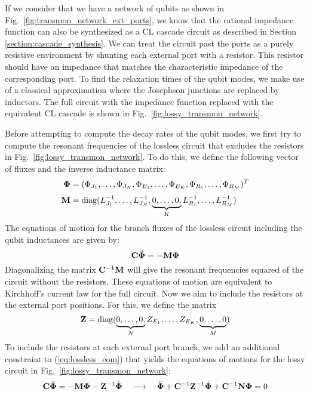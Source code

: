 If we consider that we have a network of qubits as shown in Fig.\ \ref{fig:transmon_network_ext_ports}, we know that the rational impedance function can also be synthesized as a CL cascade circuit as described in Section \ref{section:cascade_synthesis}. We can treat the circuit past the ports as a purely resistive environment by shunting each external port with a resistor. This resistor should have an impedance that matches the characteristic impedance of the corresponding port. To find the relaxation times of the qubit modes, we make use of a classical approximation where the Josephson junctions are replaced by inductors. The full circuit with the impedance function replaced with the equivalent CL cascade is shown in Fig.\ \ref{fig:lossy_transmon_network}. 

Before attempting to compute the decay rates of the qubit modes, we first try to compute the resonant frequencies of the lossless circuit that excludes the resistors in Fig.\ \ref{fig:lossy_transmon_network}. To do this, we define the following vector of fluxes and the inverse inductance matrix:
\begin{align}
    \vb{\Phi} &= (\Phi_{J_1},\dots,\Phi_{J_N},\Phi_{E_1},\dots,\Phi_{E_K},\Phi_{R_1},\dots,\Phi_{R_M})^T \\[.1cm]
    \vb{M} &= \operatorname{diag}(L_{J_1}^{-1},\dots,L_{J_N}^{-1},\underbrace{0,\dots,0,}_{K} L_{R_1}^{-1},\dots,L_{R_M}^{-1})
\end{align}
The equations of motion for the branch fluxes of the lossless circuit including the qubit inductances are given by:
\begin{equation}\label{eq:lossless_eom}
    \vb{C}\ddot{\vb{\Phi}} = -\vb{M}\vb{\Phi}
\end{equation}
Diagonalizing the matrix $\vb{C}^{-1}\vb{M}$ will give the resonant frequencies squared of the circuit without the resistors. These equations of motion are equivalent to Kirchhoff's current law for the full circuit. Now we aim to include the resistors at the external port positions. For this, we define the matrix 
\begin{equation}
    \vb{Z} = \operatorname{diag}(\underbrace{0,\dots,0,}_{N}Z_{E_1},\dots,Z_{E_K},\underbrace{0,\dots,0}_{M})
\end{equation}
To include the resistors at each external port branch, we add an additional constraint to (\ref{eq:lossless_eom}) that yields the equations of motions for the lossy circuit in Fig.\ \ref{fig:lossy_transmon_network}:
\begin{equation}\label{eq:lossy_eom}
    \vb{C}\ddot{\vb{\Phi}} = -\vb{M}\vb{\Phi} - \vb{Z}^{-1}\dot{\vb{\Phi}} \quad\longrightarrow\quad \ddot{\vb{\Phi}} + \vb{C}^{-1}\vb{Z}^{-1}\dot{\vb{\Phi}} + \vb{C}^{-1}\vb{N}\vb{\Phi} = 0
\end{equation}
